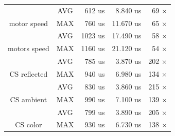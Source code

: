 \begin{table}[]
\begin{tabular}{@{}ccrrr@{}}
\multicolumn{1}{|c}{}                                & \cellcolor[HTML]{EFEFEF}AVG & \cellcolor[HTML]{EFEFEF}    612 us & \cellcolor[HTML]{EFEFEF}    8.840 us & \multicolumn{1}{r|}{\cellcolor[HTML]{EFEFEF}     69 $\times$}  \\
\multicolumn{1}{|c}{\multirow{-2}{*}{motor speed}}   & \cellcolor[HTML]{FFFFFF}MAX & \cellcolor[HTML]{FFFFFF}    760 us & \cellcolor[HTML]{FFFFFF}   11.670 us & \multicolumn{1}{r|}{\cellcolor[HTML]{FFFFFF}     65 $\times$}  \\ \midrule
\multicolumn{1}{|c}{}                                & \cellcolor[HTML]{EFEFEF}AVG & \cellcolor[HTML]{EFEFEF}   1023 us & \cellcolor[HTML]{EFEFEF}   17.490 us & \multicolumn{1}{r|}{\cellcolor[HTML]{EFEFEF}     58 $\times$}  \\
\multicolumn{1}{|c}{\multirow{-2}{*}{motors speed}}  & \cellcolor[HTML]{FFFFFF}MAX & \cellcolor[HTML]{FFFFFF}   1160 us & \cellcolor[HTML]{FFFFFF}   21.120 us & \multicolumn{1}{r|}{\cellcolor[HTML]{FFFFFF}     54 $\times$}  \\ \midrule
\multicolumn{1}{|c}{}                                & \cellcolor[HTML]{EFEFEF}AVG & \cellcolor[HTML]{EFEFEF}    785 us & \cellcolor[HTML]{EFEFEF}    3.870 us & \multicolumn{1}{r|}{\cellcolor[HTML]{EFEFEF}    202 $\times$}  \\
\multicolumn{1}{|c}{\multirow{-2}{*}{CS reflected}}  & \cellcolor[HTML]{FFFFFF}MAX & \cellcolor[HTML]{FFFFFF}    940 us & \cellcolor[HTML]{FFFFFF}    6.980 us & \multicolumn{1}{r|}{\cellcolor[HTML]{FFFFFF}    134 $\times$}  \\ \midrule
\multicolumn{1}{|c}{}                                & \cellcolor[HTML]{EFEFEF}AVG & \cellcolor[HTML]{EFEFEF}    830 us & \cellcolor[HTML]{EFEFEF}    3.860 us & \multicolumn{1}{r|}{\cellcolor[HTML]{EFEFEF}    215 $\times$}  \\
\multicolumn{1}{|c}{\multirow{-2}{*}{CS ambient}}    & \cellcolor[HTML]{FFFFFF}MAX & \cellcolor[HTML]{FFFFFF}    990 us & \cellcolor[HTML]{FFFFFF}    7.100 us & \multicolumn{1}{r|}{\cellcolor[HTML]{FFFFFF}    139 $\times$}  \\ \midrule
\multicolumn{1}{|c}{}                                & \cellcolor[HTML]{EFEFEF}AVG & \cellcolor[HTML]{EFEFEF}    799 us & \cellcolor[HTML]{EFEFEF}    3.890 us & \multicolumn{1}{r|}{\cellcolor[HTML]{EFEFEF}    205 $\times$}  \\
\multicolumn{1}{|c}{\multirow{-2}{*}{CS color}}      & \cellcolor[HTML]{FFFFFF}MAX & \cellcolor[HTML]{FFFFFF}    930 us & \cellcolor[HTML]{FFFFFF}    6.730 us & \multicolumn{1}{r|}{\cellcolor[HTML]{FFFFFF}    138 $\times$}  \\ \midrule

\end{tabular}
\end{table}
